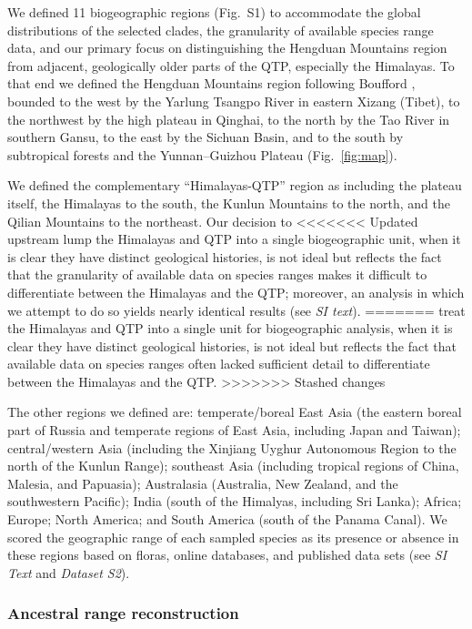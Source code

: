 We defined 11 biogeographic regions (Fig.~S1) to accommodate the
global distributions of the selected clades, the granularity of
available species range data, and our primary focus on distinguishing
the Hengduan Mountains region from adjacent, geologically older parts
of the QTP, especially the Himalayas. To that end we defined the
Hengduan Mountains region following Boufford \citep{Boufford2014},
bounded to the west by the Yarlung Tsangpo River in eastern Xizang
(Tibet), to the northwest by the high plateau in Qinghai, to the north
by the Tao River in southern Gansu, to the east by the Sichuan Basin,
and to the south by subtropical forests and the Yunnan–Guizhou Plateau
(Fig.~\ref{fig:map}).

We defined the complementary ``Himalayas-QTP'' region as including the
plateau itself, the Himalayas to the south, the Kunlun Mountains to
the north, and the Qilian Mountains to the northeast. Our decision to
<<<<<<< Updated upstream
lump the Himalayas and QTP into a single biogeographic unit, when it
is clear they have distinct geological histories, is not ideal but
reflects the fact that the granularity of available data on species
ranges makes it difficult to differentiate between the Himalayas and
the QTP; moreover, an analysis in which we attempt to do so yields
nearly identical results (see \textit{SI text}).
=======
treat the Himalayas and QTP into a single unit for biogeographic
analysis, when it is clear they have distinct geological histories, is
not ideal but reflects the fact that available data on species ranges
often lacked sufficient detail to differentiate between the Himalayas
and the QTP.
>>>>>>> Stashed changes

The other regions we defined are: temperate/boreal East Asia (the
eastern boreal part of Russia and temperate regions of East Asia,
including Japan and Taiwan); central/western Asia (including the
Xinjiang Uyghur Autonomous Region to the north of the Kunlun Range);
southeast Asia (including tropical regions of China, Malesia, and
Papuasia); Australasia (Australia, New Zealand, and the southwestern
Pacific); India (south of the Himalyas, including Sri Lanka); Africa;
Europe; North America; and South America (south of the Panama
Canal). We scored the geographic range of each sampled species as its
presence or absence in these regions based on floras, online
databases, and published data sets (see \textit{SI Text} and
\textit{Dataset S2}).

\subsubsection*{Ancestral range reconstruction}

